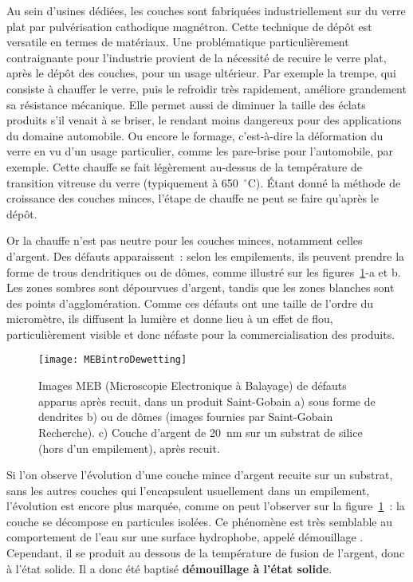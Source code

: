 Au sein d'usines dédiées, les couches sont fabriquées industriellement sur du verre plat par pulvérisation cathodique magnétron. Cette technique de dépôt est versatile en termes de matériaux. Une problématique particulièrement contraignante pour l'industrie provient de la nécessité de recuire le verre plat, après le dépôt des couches, pour un usage ultérieur. Par exemple la trempe, qui consiste à chauffer le verre, puis le refroidir très rapidement, améliore grandement sa résistance mécanique. Elle permet aussi de diminuer la taille des éclats produits s'il venait à se briser, le rendant moins dangereux  pour des applications du domaine automobile. Ou encore le formage, c'est-à-dire la déformation du verre en vu d'un usage particulier, comme les pare-brise pour l'automobile, par exemple. Cette chauffe se fait légèrement au-dessus de la température de transition vitreuse du verre (typiquement à 650~$^\circ$C). Étant donné la méthode de croissance des couches minces, l'étape de chauffe ne peut se faire qu'après le dépôt.\par
Or la chauffe n'est pas neutre pour les couches minces, notamment celles d'argent. Des défauts apparaissent~: selon les empilements, ils peuvent prendre la forme de trous dendritiques ou de dômes, comme illustré sur les figures~\ref{MEBintroDewetting}-a et b. Les zones sombres sont dépourvues d'argent, tandis que les zones blanches sont des points d'agglomération. Comme ces défauts ont une taille de l'ordre du micromètre, ils diffusent la lumière et donne lieu à un effet de flou, particulièrement visible et donc néfaste pour la commercialisation des produits.\par 
\begin{figure}[!htb]
\centering
\texttt{[image: MEBintroDewetting]}
\caption{Images MEB (Microscopie Electronique à Balayage) de défauts apparus après recuit, dans un produit Saint-Gobain a)  sous forme de \og dendrites \fg{} b) ou de \og dômes \fg (images fournies par Saint-Gobain Recherche). c) Couche d'argent de 20~nm sur un substrat de silice (hors d'un empilement), après recuit.}
\label{MEBintroDewetting}
\end{figure}
Si l'on observe l'évolution d'une couche mince d'argent recuite sur un substrat, sans les autres couches qui l'encapsulent usuellement dans un empilement, l'évolution est encore plus marquée, comme on peut l'observer sur la figure~\ref{MEBintroDewetting}~: la couche se décompose en particules isolées. Ce phénomène est très semblable au comportement de l'eau sur une surface hydrophobe, appelé \og démouillage \fg. Cependant, il se produit au dessous de la température de fusion de l'argent, donc à l'état solide. Il a donc été baptisé \textbf{démouillage à l'état solide}.

